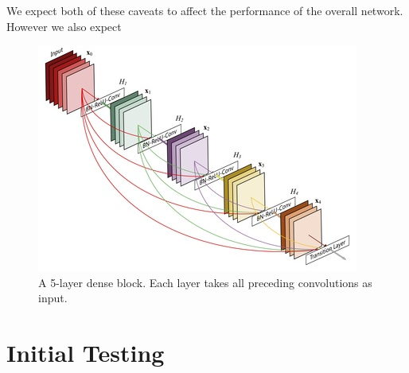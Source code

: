 \documentclass{article}
\begin{document}
We expect both of these caveats to affect the performance of the overall network.
However we also expect

\begin{figure}
        \centering
        \includegraphics[width=0.3\linewidth]{figures/dense_block}
        \caption{A 5-layer dense block. Each layer takes all preceding convolutions as input.}
        \label{fig:DenseBlock}
\end{figure}

\section{ Initial Testing}
\end{document}
